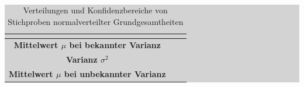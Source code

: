 \begin{table}[H]
\setlength{\arrayrulewidth}{.1em}
\caption{Verteilungen und Konfidenzbereiche von Stichproben normalverteilter Grundgesamtheiten}
\setlength{\fboxsep}{0pt}%
\colorbox{lightgray}{%
%
\begin{tabular}{| c | c | c |}
\hline
\parbox[c][0.3in][c]{1.8in}{\smallskip\centering\textbf{\selectfont{ }}} & 
\parbox[c][0.3in][c]{2.25in}{\smallskip\centering\textbf{\selectfont{Verteilung der Schätzfunktion}}} & 
\parbox[c][0.3in][c]{2.25in}{\smallskip\centering\textbf{\selectfont{Konfidenzbereich}}}\\ \hline

\parbox[c][1in][c]{1.8in}{\centering{}\selectfont\textbf{Mittelwert $\mu$\\ bei bekannter Varianz}} & 
\parbox[c][1in][c]{2.25in}{\centering{}} & 
\parbox[c][1in][c]{2.25in}{\centering{}}\\ \hline

\parbox[c][1in][c]{1.8in}{\centering{}\selectfont\textbf{Varianz $\sigma^{2}$}} & 
\parbox[c][1in][c]{2.25in}{\centering{}} & 
\parbox[c][1in][c]{2.25in}{\centering{}}\\ \hline

\parbox[c][1in][c]{1.8in}{\centering{}\selectfont\textbf{Mittelwert $\mu$\\ bei unbekannter Varianz }} & 
\parbox[c][1in][c]{2.25in}{\centering{}} & 
\parbox[c][1in][c]{2.25in}{\centering{}}\\ \hline

\end{tabular}%
}
\label{tab:fivesix}
\end{table}

